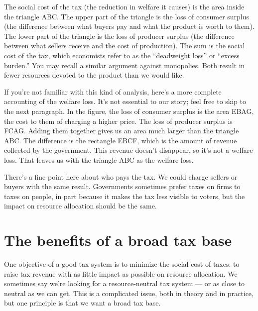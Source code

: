The social cost of the tax (the reduction in welfare it causes)
is the area inside the triangle ABC.
The upper part of the triangle is the loss of consumer surplus 
(the difference between what buyers pay and what the product is worth to them).
The lower part of the triangle is the loss of producer surplus 
(the difference between what sellers receive and the cost of production).
The sum is the social cost of the tax,
which economists refer to as the ``deadweight loss'' 
 or  ``excess burden.''
You may recall a similar argument against monopolies.
Both result in fewer resources devoted to the product
than we would like.

If you're not familiar with this kind of analysis,
here's a more complete accounting
 of the welfare loss.
It's not essential to our story; feel free to skip to the next paragraph.
In the figure, the loss of consumer surplus  is the area EBAG,
the cost to them of charging a higher price.
The loss of producer surplus is FCAG.
Adding them together gives us an area much larger than the triangle ABC.
The difference is the rectangle EBCF,
which is the amount of revenue collected by the government.
This revenue doesn't disappear, so it's not a welfare loss.
That leaves us with the triangle ABC as the welfare loss. 

There's a fine point here about who pays the tax.
We could charge sellers or buyers with the same result.
Governments sometimes prefer taxes on firms to taxes on
people, in part because it makes the tax less visible to voters,
but the impact on resource allocation should be the same.


\section{The benefits of a broad tax base  
}


One objective of a good tax system is to minimize the social cost
of taxes:  to raise tax revenue with as little impact as possible
on resource allocation.
We sometimes say we're looking for a resource-neutral tax system ---
or as close to neutral as we can get.
This is a
complicated issue, both in theory and in practice,
but one principle is that we want a broad tax base.


